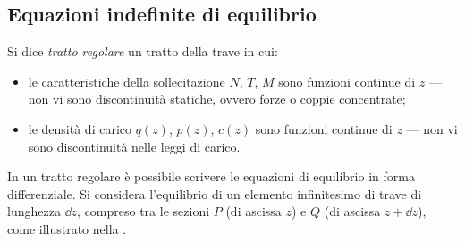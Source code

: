 \subsection{Equazioni indefinite di equilibrio}
\label{sec:eq_indefinite}

Si dice \emph{tratto regolare} un tratto della trave
in cui:
\begin{itemize}[nosep]
	\item le caratteristiche della sollecitazione
	$N$, $T$, $M$ sono funzioni continue di $z$
	--- non vi sono discontinuità statiche, ovvero
	forze o coppie concentrate;
	\item le densità di carico $q(z)$, $p(z)$,
	$c(z)$ sono funzioni continue di $z$ --- non
	vi sono discontinuità nelle leggi di carico.
\end{itemize}

In un tratto regolare è possibile scrivere le
equazioni di equilibrio in forma differenziale.
Si considera l'equilibrio di un elemento
infinitesimo di trave di lunghezza $\dd z$,
compreso tra le sezioni $P$ (di ascissa $z$) e
$Q$ (di ascissa $z + \dd z$), come illustrato
nella .


